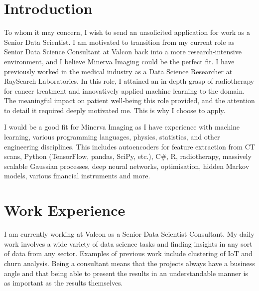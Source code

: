 \documentclass[10pt,a4paper,sans]{moderncv.cls}
\newcommand{\company}{Minerva Imaging}
\begin{document}
\makecvtitle
\pagestyle{empty}

\section{Introduction}

To whom it may concern, I wish to send an unsolicited application for work as a Senior Data Scientist. I am motivated to transition from my current role as Senior Data Science Consultant at Valcon back into a more research-intensive environment, and I believe \company{} could be the perfect fit. I have previously worked in the medical industry as a Data Science Researcher at RaySearch Laboratories. In this role, I attained an in-depth grasp of radiotherapy for cancer treatment and innovatively applied machine learning to the domain. The meaningful impact on patient well-being this role provided, and the attention to detail it required deeply motivated me. This is why I choose to apply.

\hspace{7 mm} I would be a good fit for \company{} as I have experience with machine learning, various programming languages, physics, statistics, and other engineering disciplines. This includes autoencoders for feature extraction from CT scans, Python (TensorFlow, pandas, SciPy, etc.), C\#, R, radiotherapy, massively scalable Gaussian processes, deep neural networks, optimisation, hidden Markov models, various financial instruments and more.

\section{Work Experience}
I am currently working at Valcon as a Senior Data Scientist Consultant. My daily work involves a wide variety of data science tasks and finding insights in any sort of data from any sector. Examples of previous work include clustering of IoT and churn analysis. Being a consultant means that the projects always have a business angle and that being able to present the results in an understandable manner is as important as the results themselves.
\end{document}
